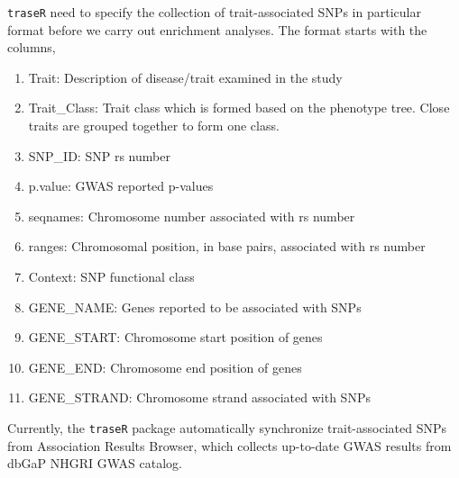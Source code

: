 \documentclass{article}
\begin{document}
{\tt traseR} need to specify the collection of trait-associated SNPs in particular format
before we carry out enrichment analyses. The format starts with the columns,
\begin{enumerate}
\item Trait: Description of disease/trait examined in the study
\item Trait\_Class: Trait class which is formed based on the phenotype tree. Close traits are grouped together to form one class.
\item SNP\_ID: SNP rs number
\item p.value: GWAS reported p-values
\item seqnames: Chromosome number associated with rs number
\item ranges: Chromosomal position, in base pairs, associated with rs number
\item Context: SNP functional class
\item GENE\_NAME:  Genes reported to be associated with SNPs
\item GENE\_START: Chromosome start position of genes
\item GENE\_END: Chromosome end position of genes
\item GENE\_STRAND: Chromosome strand associated with SNPs
\end{enumerate}
Currently, the {\tt traseR} package automatically synchronize trait-associated SNPs from 
Association Results Browser, which collects up-to-date GWAS results from dbGaP 
NHGRI GWAS catalog.
\end{document}
